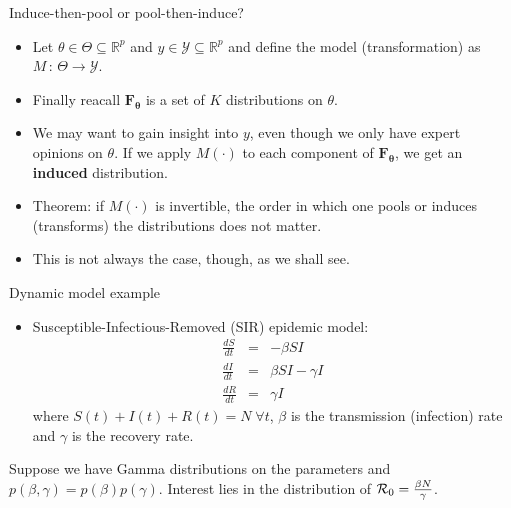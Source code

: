 \begin{frame}{Induce-then-pool or pool-then-induce?}
\begin{itemize}
 \item Let $\theta \in \Theta \subseteq \mathbb{R}^p$ and $y \in \mathcal{Y} \subseteq \mathbb{R}^p$ and define the model (transformation) as $M \,:\, \Theta \to \mathcal{Y}$.
 \item Finally reacall $\mathbf{F_\theta}$ is a set of $K$ distributions on $\theta$.
 \item We may want to gain insight into $y$, even though we only have expert opinions on $\theta$.
 If we apply $M(\cdot)$ to each component of $\mathbf{F_\theta}$, we get an \textbf{induced} distribution.
 \item Theorem: if $M(\cdot)$ is invertible, the order in which one pools or induces (transforms) the distributions does not matter.
 \item This is not always the case, though, as we shall see.
\end{itemize}
\end{frame}
\begin{frame}{Dynamic model example}
\begin{itemize}
 \item Susceptible-Infectious-Removed (SIR) epidemic model:
 \begin{eqnarray*}
\frac{dS}{dt}&=& - \beta SI\\
\frac{dI}{dt}&=&  \beta SI - \gamma I\\
\frac{dR}{dt}&=& \gamma I 
\end{eqnarray*} 
where  $S(t) + I(t) + R(t) = N \; \forall t$, $\beta$ is the transmission (infection) rate and $\gamma$ is the recovery rate.
\end{itemize}
Suppose we have Gamma distributions on the parameters and $p(\beta, \gamma) = p(\beta)p(\gamma)$.
Interest lies in the distribution of ${\cal R}_0 = \frac{\beta N}{\gamma}$.
\end{frame}

